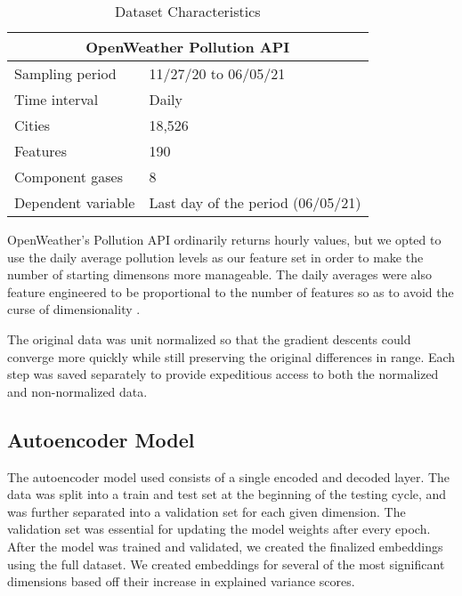 \documentclass{article}
\begin{document}
\begin{table}[h!]
\begin{center}
    \caption{Dataset Characteristics}
    \label{tab:table1}
    \vspace{0.1cm}
    \begin{tabular}{p{4cm}p{7cm}}
        \hline
        \multicolumn{2}{c}{OpenWeather Pollution API} \\
        \hline
        Sampling period  & 11/27/20 to 06/05/21\\
        Time interval & Daily  \\
        Cities & 18,526 \\
        Features & 190 \\
        Component gases & 8 \\
        Dependent variable & Last day of the period (06/05/21) \\
        \hline
    \end{tabular}
\end{center}
\end{table}
\par OpenWeather's Pollution API ordinarily returns hourly values, but we opted to use the daily average pollution levels as our feature set in order to make the number of starting dimensons more manageable. The daily averages were also feature engineered to be proportional to the number of features so as to avoid the curse of dimensionality \parencite{Trunk79}. 
\par The original data was unit normalized so that the gradient descents could converge more quickly while still preserving the original differences in range. Each step was saved separately to provide expeditious access to both the normalized and non-normalized data.

\subsection{Autoencoder Model}
\par The autoencoder model used consists of a single encoded and decoded layer. The data was split into a train and test set at the beginning of the testing cycle, and was further separated into a validation set for each given dimension. The validation set was essential for updating the model weights after every epoch. After the model was trained and validated, we created the finalized embeddings using the full dataset. We created embeddings for several of the most significant dimensions based off their increase in explained variance scores.
\end{document}
